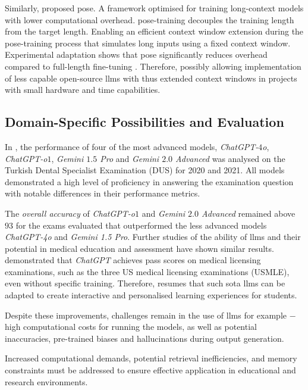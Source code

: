 Similarly, \citet{zhu2024poseefficientcontextwindow} proposed \ac{pose}.
A framework optimised for training long-context models with lower computational overhead. 
\ac{pose}-training decouples the training length from the target length.
Enabling an efficient context window extension during the \ac{pose}-training process that simulates long inputs using a fixed context window.
Experimental adaptation shows that \ac{pose} significantly reduces overhead compared to full-length fine-tuning \citep{zhu2024poseefficientcontextwindow}.
Therefore, possibly allowing implementation of less capable open-source \acp{llm} with thus extended context windows in projects with small hardware and time capabilities.
\subsection[Domain-Specific Evaluation]{Domain-Specific Possibilities and Evaluation}

In \citet{kinikogluI2025GPTGemini}, the performance of four of the most advanced models, \textit{ChatGPT-$4$o}, \textit{ChatGPT-o$1$}, \textit{Gemini $1.5$ Pro} and \textit{Gemini $2.0$ Advanced} was analysed on the Turkish Dental Specialist Examination (DUS) for 2020 and 2021.
All models demonstrated a high level of proficiency in answering the examination question with notable differences in their performance metrics.
%

The \textit{overall accuracy} of \textit{ChatGPT-o$1$} and \textit{Gemini $2.0$ Advanced} remained above $93$ for the exams evaluated that outperformed the less advanced models \textit{ChatGPT-4o} and \textit{Gemini 1.5 Pro}.
Further studies of the ability of \acp{llm} and their potential in medical education and assessment have shown similar results.
%
\citet{USMLE2023, chatgpt2023USMLE} demonstrated that \textit{ChatGPT} achieves pass scores on medical licensing examinations, such as the three US medical licensing examinations (USMLE), even without specific training. 
Therefore, \citet{kinikogluI2025GPTGemini} resumes that such \ac{sota} \acp{llm} can be adapted to create interactive and personalised learning experiences for students.
%

%
Despite these improvements, challenges remain in the use of \acp{llm} for example $-$ high computational costs for running the models, as well as potential inaccuracies, pre-trained biases and hallucinations during output generation.

Increased computational demands, potential retrieval inefficiencies, and memory constraints must be addressed to ensure effective application in educational and research environments. 
%


